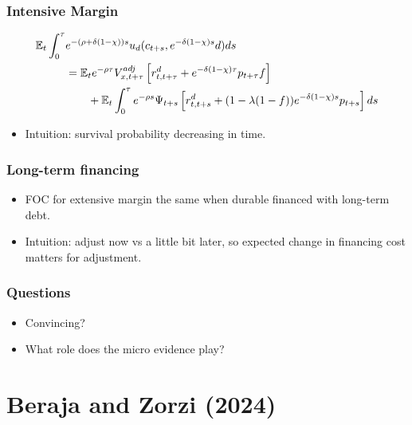 \documentclass[english,xcolor=svgnames]{beamer}
\begin{document}
\begin{frame}
    \frametitle{Intensive Margin}
\begin{align*}
		\mathbb{E}_t\int_0^{\tau} &e^{-(\rho+\delta(1-\chi)) s} u_d(c_{t+s},e^{-\delta(1-\chi) s}d)ds \\
		&=   \mathbb{E}_t e^{-\rho \tau}V_{x,t+\tau}^{adj}\left[r^d_{t,t+\tau}  + e^{-\delta(1-\chi) \tau}p_{t+\tau} f\right] \\
		& \qquad + \mathbb{E}_t\int_0^{\tau}e^{-\rho s}\Psi_{t+s}\left[r^d_{t,t+s} + (1-\lambda(1-f))e^{-\delta(1-\chi)s}p_{t+s}\right]ds \\
	\end{align*}
\begin{itemize}
	\item Intuition: survival probability decreasing in time.
\end{itemize}
\end{frame}

\begin{frame}
    \frametitle{Long-term financing}
\begin{itemize}
	\item FOC for extensive margin the same when durable financed with long-term debt.
	\item Intuition: adjust now vs a little bit later, so expected change in financing cost matters for adjustment.
\end{itemize}
\end{frame}

\begin{frame}
    \frametitle{Questions}
	\begin{itemize}
		\item Convincing?
		\item What role does the micro evidence play?
	\end{itemize}
\end{frame}

\section{Beraja and Zorzi (2024)}
\end{document}
